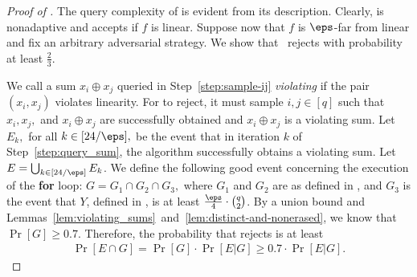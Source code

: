 \documentclass[11pt]{article}
\numberwithin{equation}{section}
\theoremstyle{definition}
\theoremstyle{plain}
\begin{document}
\begin{proof}[Proof of ] The query complexity of  is evident from its description. Clearly,  is nonadaptive and accepts if $f$ is linear. Suppose now that $f$ is $\eps$-far from linear and fix an arbitrary adversarial strategy. We show that~ rejects with probability at least $\frac{2}{3}$. 


We call a sum $x_i \oplus x_j$ queried in Step~\ref{step:sample-ij} {\em violating} if the pair $(x_i, x_j)$ violates linearity. For  to reject, %
it must sample $i,j\in[q]$ such that $x_i, x_j,$ and $x_i \oplus x_j$ are successfully obtained and $x_i \oplus x_j$ is a violating sum. 
%
Let $E_k,$ for all $k\in[24/\eps],$ be the event that in iteration $k$ of Step~\ref{step:query_sum}, the algorithm successfully obtains a violating sum. Let $E=\bigcup_{k\in[24/\eps]} E_k$. 
We define the following good event concerning the execution of the \textbf{for} loop: $G=G_1\cap G_2\cap G_3,$ where $G_1$ and $G_2$ are as defined in , and $G_3$ is the event that $Y$, defined in , is at least $\frac{\eps} 4 \cdot\binom{q}{2}$. By a union bound and Lemmas~\ref{lem:violating_sums}~and~\ref{lem:distinct-and-nonerased}, we know that $\Pr[G]\geq 0.7.$
Therefore, the probability that  rejects 
   is at least 
   \begin{align*}
         \Pr[E \cap G]=\Pr[G]\cdot\Pr[E|G]\geq 0.7\cdot\Pr[E|G].
   \end{align*}
 
   
   

\end{proof}
\end{document}

